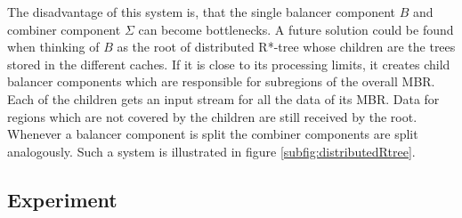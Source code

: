 The disadvantage of this system is, that the single balancer component $B$ and combiner component $\Sigma$ can become bottlenecks. A future solution could be found when thinking of $B$ as the root of distributed R*-tree whose children are the trees stored in the different caches. If it is close to its processing limits, it creates child balancer components which are responsible for subregions of the overall MBR. Each of the children gets an input stream for all the data of its MBR. Data for regions which are not covered by the children are still received by the root. Whenever a balancer component is split the combiner components are split analogously. Such a system is illustrated in figure \ref{subfig:distributedRtree}.

\subsection{Experiment}\label{sec:experiment}
